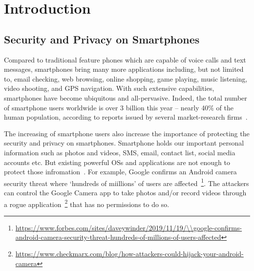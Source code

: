 \chapter{Introduction}

%	
%	
%	

\section{Security and Privacy on Smartphones}
Compared to traditional feature phones which are capable of voice calls and text messages,
%
smartphones bring many more applications including, but not limited to, email checking, web browsing, online shopping, game playing, music listening, video shooting, and GPS navigation.
%
%
%
%
With such extensive capabilities, smartphones have become ubiquitous and all-pervasive.
%
Indeed, the total number of smartphone users worldwide is over 3 billion this year -- nearly 40\% of the human population, according to reports issued by several market-research firms~\cite{report2018newzoo,report2019forrester}. 


The increasing of smartphone users also increase the importance of protecting the security and privacy on smartphones. 
%
Smartphone holds our important personal information such as photos and videos, SMS, email, contact list, social media accounts etc. But existing powerful OSs and applications are not enough to protect those infromation~\cite{ali2019security}. For example, Google confirms an Android camera security threat where `hundreds of miillions' of users are affected~\footnote{\url{https://www.forbes.com/sites/daveywinder/2019/11/19/\\google-confirms-android-camera-security-threat-hundreds-of-millions-of-users-affected}}. The attackers can control the Google Camera app to take photos and/or record videos through a rogue application~\footnote{\url{https://www.checkmarx.com/blog/how-attackers-could-hijack-your-android-camera}} that has no permissions to do so. 


